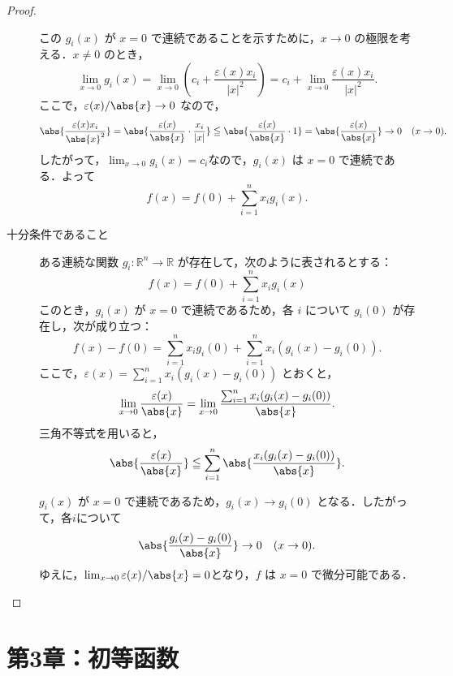 \documentclass[a4paper,10pt,fleqn]{ltjsarticle}
\begin{document}
\begin{tleftbar}
\begin{proof}
\begin{description}
            この $ g_i(x) $ が $ x=0 $ で連続であることを示すために，$ x \to 0 $ の極限を考える．$ x \ne 0 $ のとき，
            \[
            \lim_{x \to 0} g_i(x) = \lim_{x \to 0} \left( c_i + \frac{\varepsilon(x) x_i}{|x|^2} \right) = c_i + \lim_{x \to 0} \frac{\varepsilon(x) x_i}{|x|^2}.
            \]
            ここで，$\varepsilon(x)/\abs{x} \to 0 $ なので，
            \[
            \abs{\frac{\varepsilon(x) x_i}{\abs{x}^2}} = \abs{\frac{\varepsilon(x)}{\abs{x}} \cdot \frac{x_i}{|x|}} \leqq  \abs{\frac{\varepsilon(x)}{\abs{x}} \cdot 1} = \abs{\frac{\varepsilon(x)}{\abs{x}}} \to 0 \quad (x \to 0).
            \]
            したがって，$\lim_{x \to 0} g_i(x) = c_i$なので，$ g_i(x) $ は $ x=0 $ で連続である．よって
            \[
            f(x) = f(0) + \sum_{i=1}^n x_i g_i(x).
            \]
            \item [十分条件であること]
            ある連続な関数 $ g_i \colon \mathbb{R}^n \to \mathbb{R} $ が存在して，次のように表されるとする：
            \[
            f(x) = f(0) + \sum_{i=1}^n x_i g_i(x)
            \]
            このとき，$ g_i(x) $ が $ x=0 $ で連続であるため，各 $ i $ について $ g_i(0) $ が存在し，次が成り立つ：
            \[
            f(x) - f(0) = \sum_{i=1}^n x_i g_i(0) + \sum_{i=1}^n x_i (g_i(x) - g_i(0)).
            \]
            ここで，$ \varepsilon(x) = \sum_{i=1}^n x_i (g_i(x) - g_i(0)) $ とおくと，
            \[
            \lim_{x \to 0} \frac{\varepsilon(x)}{\abs{x}} = \lim_{x \to 0} \frac{\sum_{i=1}^n x_i (g_i(x) - g_i(0))}{\abs{x}}.
            \]
            三角不等式を用いると，
            \[
            \abs{ \frac{\varepsilon(x)}{\abs{x}} } \leqq \sum_{i=1}^n \abs{ \frac{x_i(g_i(x) - g_i(0))}{\abs{x}} }.
            \]

            $ g_i(x) $ が $ x=0 $ で連続であるため，$ g_i(x) \to g_i(0) $ となる．したがって，各$ i $について
            \[
            \abs{ \frac{g_i(x) - g_i(0)}{\abs{x}} } \to 0 \quad (x \to 0).
            \]
            ゆえに，$\lim_{x \to 0} \varepsilon(x)/\abs{x} = 0$となり，$ f $ は $ x=0 $ で微分可能である．
        \end{description}
    \end{proof}
\end{tleftbar}

\part*{第3章：初等函数}
\end{document}
